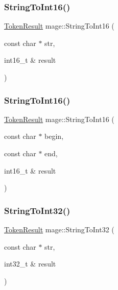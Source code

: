 \hypertarget{namespacemage_a5889574dc8d73ffa614ad8541e0b312a}{}\label{namespacemage_a5889574dc8d73ffa614ad8541e0b312a} 
\subsubsection{\texorpdfstring{String\+To\+Int16()}{StringToInt16()}\hspace{0.1cm}{\footnotesize\ttfamily [1/2]}}
{\footnotesize\ttfamily \hyperlink{namespacemage_a2178ba2411db5912f41b2e7698c2037d}{Token\+Result} mage\+::\+String\+To\+Int16 (\begin{DoxyParamCaption}\item[{const char $\ast$}]{str,  }\item[{int16\+\_\+t \&}]{result }\end{DoxyParamCaption})}

\hypertarget{namespacemage_aa993ba23b5023902c29ecbe9b0d7a954}{}\label{namespacemage_aa993ba23b5023902c29ecbe9b0d7a954} 
\subsubsection{\texorpdfstring{String\+To\+Int16()}{StringToInt16()}\hspace{0.1cm}{\footnotesize\ttfamily [2/2]}}
{\footnotesize\ttfamily \hyperlink{namespacemage_a2178ba2411db5912f41b2e7698c2037d}{Token\+Result} mage\+::\+String\+To\+Int16 (\begin{DoxyParamCaption}\item[{const char $\ast$}]{begin,  }\item[{const char $\ast$}]{end,  }\item[{int16\+\_\+t \&}]{result }\end{DoxyParamCaption})}

\hypertarget{namespacemage_a805f1cf7436782f77b49085194451d07}{}\label{namespacemage_a805f1cf7436782f77b49085194451d07} 
\subsubsection{\texorpdfstring{String\+To\+Int32()}{StringToInt32()}\hspace{0.1cm}{\footnotesize\ttfamily [1/2]}}
{\footnotesize\ttfamily \hyperlink{namespacemage_a2178ba2411db5912f41b2e7698c2037d}{Token\+Result} mage\+::\+String\+To\+Int32 (\begin{DoxyParamCaption}\item[{const char $\ast$}]{str,  }\item[{int32\+\_\+t \&}]{result }\end{DoxyParamCaption})}

